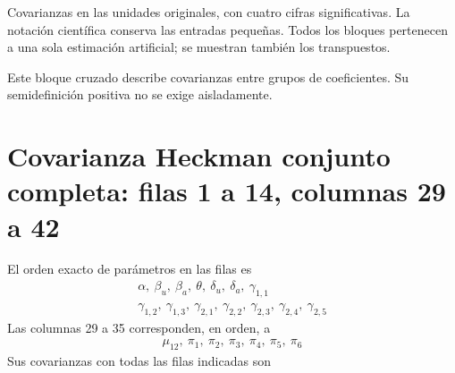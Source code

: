 \documentclass[11pt,a4paper]{article}
\begin{document}
Covarianzas en las unidades originales, con cuatro cifras significativas. La notación científica conserva las entradas pequeñas. Todos los bloques pertenecen a una sola estimación artificial; se muestran también los transpuestos.

Este bloque cruzado describe covarianzas entre grupos de coeficientes. Su semidefinición positiva no se exige aisladamente.

\clearpage
\section{Covarianza Heckman conjunto completa: filas 1 a 14, columnas 29 a 42}
El orden exacto de parámetros en las filas es
\[
\begin{gathered}\alpha,\ \beta_u,\ \beta_a,\ \theta,\ \delta_u,\ \delta_a,\ \gamma_{1,1}\\\gamma_{1,2},\ \gamma_{1,3},\ \gamma_{2,1},\ \gamma_{2,2},\ \gamma_{2,3},\ \gamma_{2,4},\ \gamma_{2,5}\end{gathered}
\]
Las columnas 29 a 35 corresponden, en orden, a
\[
\begin{gathered}\mu_12,\ \pi_1,\ \pi_2,\ \pi_3,\ \pi_4,\ \pi_5,\ \pi_6\end{gathered}
\]
Sus covarianzas con todas las filas indicadas son
\end{document}
